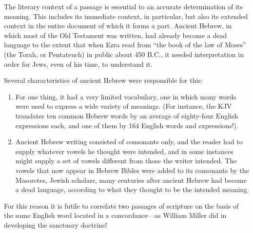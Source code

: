 The literary context of a passage is essential to an accurate determination
of its meaning. This includes its immediate context, in particular, but also
its extended context in the entire document of which it forms a part.
Ancient Hebrew, in which most of the Old Testament was written, had
already become a dead language to the extent that when Ezra read from ``the
book of the law of Moses'' (the Torah, or Pentateuch) in public about 450
B.C., it needed interpretation in order for Jews, even of his time, to
understand it.

Several characteristics of ancient Hebrew were responsible for this:
\begin{enumerate}
    \item For
one thing, it had a very limited vocabulary, one in which many words were
used to express a wide variety of meanings. (For instance, the KJV
translates ten common Hebrew words by an average of eighty-four English
expressions each, and one of them by 164 English words and
expressions!\cite{64}). 
    \item Ancient Hebrew writing consisted of consonants only,
and the reader had to supply whatever vowels he thought were intended, and
in some instances might supply a set of vowels different from those the
writer intended. The vowels that now appear in Hebrew Bibles were added to
its consonants by the Masoretes, Jewish scholars, many centuries after
ancient Hebrew had become a dead language, according to what they thought to
be the intended meaning.
\end{enumerate}
For this reason it is futile to correlate two
passages of scripture on the basis of the same English word located in a
concordance---as William Miller did in developing the sanctuary doctrine! 

